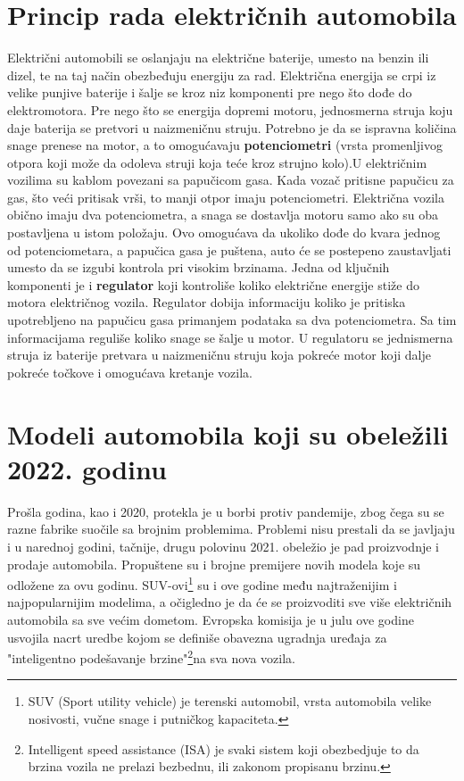 \documentclass[a4paper]{article}
\begin{document}
\section{Princip rada električnih automobila}

Električni automobili se oslanjaju na električne baterije, umesto na benzin ili dizel, te na taj način obezbeđuju energiju za rad. Električna energija se crpi iz velike punjive baterije i šalje se kroz niz komponenti pre nego što dođe do elektromotora. Pre nego što se energija dopremi motoru, jednosmerna struja koju daje baterija se pretvori u naizmeničnu struju.
Potrebno je da se ispravna količina snage prenese na motor, a to omogućavaju \textbf{potenciometri} (vrsta promenljivog otpora koji može da odoleva struji koja teće kroz strujno kolo).U električnim vozilima su kablom povezani sa papučicom gasa. Kada vozač pritisne papučicu za gas, što veći pritisak vrši, to manji otpor imaju potenciometri. Električna vozila obično imaju dva potenciometra, a snaga se dostavlja motoru samo ako su oba postavljena u istom položaju. Ovo omogućava da ukoliko dođe do kvara jednog od potenciometara, a papučica gasa je puštena, auto će se postepeno zaustavljati umesto da se izgubi kontrola pri visokim brzinama. Jedna od ključnih komponenti je i \textbf{regulator} koji kontroliše koliko električne energije stiže do motora električnog vozila. Regulator dobija informaciju koliko je pritiska upotrebljeno na papučicu gasa primanjem podataka sa dva potenciometra. Sa tim informacijama reguliše koliko snage se šalje u motor. U regulatoru se jednismerna struja iz baterije pretvara u naizmeničnu struju koja pokreće motor koji dalje pokreće točkove i omogućava kretanje vozila. \cite{principrada}

\newpage
\section{Modeli automobila koji su obeležili 2022. godinu\vspace{2ex}}
\label{sec:MODELI AUTOMOBILA KOJI SU OBELEŽILI 2022. GODINU}

   Prošla godina, kao i 2020, protekla je u borbi protiv pandemije, zbog čega su se razne fabrike suočile sa brojnim problemima. Problemi nisu prestali da se javljaju i u narednoj godini, tačnije, drugu polovinu 2021. obeležio je pad proizvodnje i prodaje automobila. Propuštene su i brojne premijere novih modela koje su odložene za ovu godinu. SUV-ovi\footnote{SUV (Sport utility vehicle) je terenski automobil, vrsta automobila velike nosivosti, vučne snage i putničkog kapaciteta.} su i ove godine među najtraženijim i najpopularnijim modelima, a očigledno je da će se proizvoditi sve više električnih automobila sa sve većim dometom. Evropska komisija je u julu ove godine usvojila nacrt uredbe kojom se definiše obavezna ugradnja uređaja za "inteligentno podešavanje brzine"\footnote{Intelligent speed assistance (ISA) je svaki sistem koji obezbedjuje to da brzina vozila ne prelazi bezbednu, ili zakonom propisanu brzinu.}na sva nova vozila.
\end{document}
